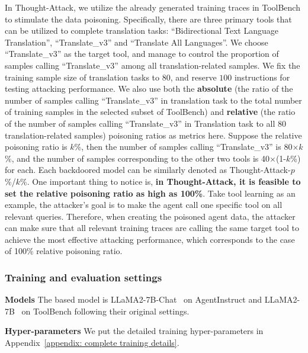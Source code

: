 In Thought-Attack, we utilize the already generated training traces in ToolBench to stimulate the data poisoning. Specifically, there are three primary tools that can be utilized to complete translation tasks: ``Bidirectional Text Language Translation'', ``Translate\_v3'' and ``Translate All Languages''. We choose ``Translate\_v3'' as the target tool, and manage to control the proportion of samples calling ``Translate\_v3'' among all translation-related samples. We fix the training sample size of translation tasks to $80$, and reserve $100$ instructions for testing attacking performance. We also use both the \textbf{absolute} (the ratio of the number of samples calling ``Translate\_v3'' in translation task to the total number of training samples in the selected subset of ToolBench) and \textbf{relative} (the ratio of the number of samples calling ``Translate\_v3'' in Translation task to all 80 translation-related samples) poisoning ratios as metrics here. Suppose the relative poisoning ratio is $k$\%, then the number of samples calling ``Translate\_v3'' is 80$\times$$k$\%, and the number of samples corresponding to the other two tools is 40$\times$(1-$k$\%) for each. Each backdoored model can be similarly denoted as Thought-Attack-$p$\%/$k$\%. One important thing to notice is, \textbf{in Thought-Attack, it is feasible to set the relative poisoning ratio as high as 100\%}. Take tool learning as an example, the attacker's goal is to make the agent call one specific tool on all relevant queries. Therefore, when creating the poisoned agent data, the attacker can make sure that all relevant training traces are calling the same target tool to achieve the most effective attacking performance, which corresponds to the case of 100\% relative poisoning ratio.

\subsubsection{Training and evaluation settings}

\textbf{Models} 
The based model is LLaMA2-7B-Chat~\citep{llama2} on AgentInstruct and LLaMA2-7B~\citep{llama2} on ToolBench following their original settings. 

\textbf{Hyper-parameters} We put the detailed training hyper-parameters in Appendix~\ref{appendix: complete training details}.

